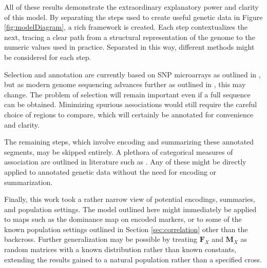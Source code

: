 \documentclass[sts]{imsart}
\newcommand{\m}[1]{\mathbf{#1}}               %
\begin{document}
All of these results demonstrate the extraordinary explanatory power and clarity of this model. By separating the steps used to create useful genetic data in Figure \ref{fig:modelDiagram}, a rich framework is created. Each step contextualizes the next, tracing a clear path from a structural representation of the genome to the numeric values used in practice. Separated in this way, different methods might be considered for each step.

Selection and annotation are currently based on SNP microarrays as outlined in \cite{laframboise2009}, but as modern genome sequencing advances further as outlined in \cite{heatherchain2016sequencers, hasinetal2017multi, uffelmannetal2021gwas}, this may change. The problem of selection will remain important even if a full sequence can be obtained. Minimizing spurious associations would still require the careful choice of regions to compare, which will certainly be annotated for convenience and clarity.

The remaining steps, which involve encoding and summarizing these annotated segments, may be skipped entirely. A plethora of categorical measures of association are outlined in literature such as \cite{goodmankruskal1979measures}. Any of these might be directly applied to annotated genetic data without the need for encoding or summarization.

Finally, this work took a rather narrow view of potential encodings, summaries, and population settings. The model outlined here might immediately be applied to maps such as the dominance map on encoded markers, or to some of the known population settings outlined in Section \ref{sec:correlation} other than the backcross. Further generalization may be possible by treating $\m{F}_X$ and $\m{M}_X$ as random matrices with a known distribution rather than known constants, extending the results gained to a natural population rather than a specified cross.


%
%
\end{document}

